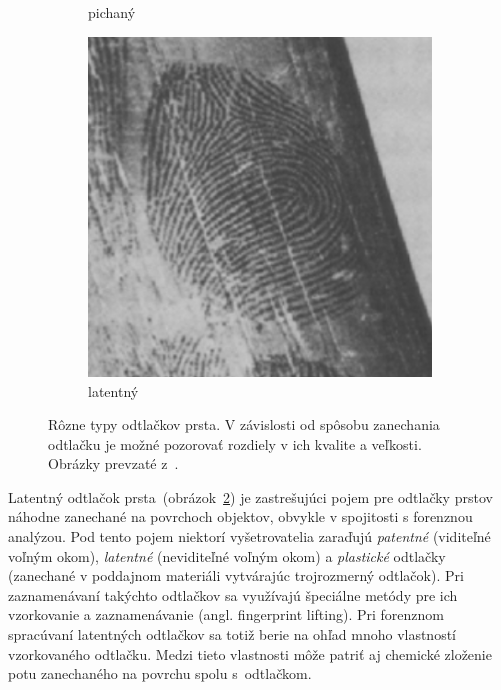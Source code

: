 \begin{figure}[h]
\begin{subfigure}[b]{0.32\linewidth}
      \caption{pichaný}
      \label{obr:pichany_odtlacok}
    \end{subfigure}
    \hfill
    \begin{subfigure}[b]{0.32\linewidth}
      \includegraphics[width=\linewidth]{obrazky-figures/latentny_odtlacok-Drahansky.png}
      \caption{latentný}
      \label{obr:latentny_odtlacok}
    \end{subfigure}
    \caption{Rôzne typy odtlačkov prsta. V závislosti od spôsobu zanechania odtlačku je možné pozorovať rozdiely v ich kvalite a veľkosti.
            Obrázky prevzaté z~{\cite{Drahansky}}.}
    \label{obr:druhy_odtlackov}
  \end{figure}
  
  Latentný odtlačok prsta~(obrázok~{\ref{obr:latentny_odtlacok}}) je zastrešujúci pojem pre odtlačky prstov náhodne zanechané na povrchoch objektov, obvykle v spojitosti
  s forenznou analýzou. Pod tento pojem niektorí vyšetrovatelia zaraďujú \emph{patentné} (viditeľné voľným okom), \emph{latentné} (neviditeľné voľným okom) a
  \emph{plastické} odtlačky
  (zanechané v poddajnom materiáli vytvárajúc trojrozmerný odtlačok). Pri zaznamenávaní takýchto odtlačkov sa využívajú špeciálne metódy pre ich vzorkovanie
  a zaznamenávanie (angl. fingerprint lifting).
  Pri forenznom spracúvaní latentných odtlačkov sa totiž berie na ohľad mnoho vlastností vzorkovaného odtlačku. Medzi tieto vlastnosti môže patriť aj
  chemické zloženie potu zanechaného na povrchu spolu s~odtlačkom.

